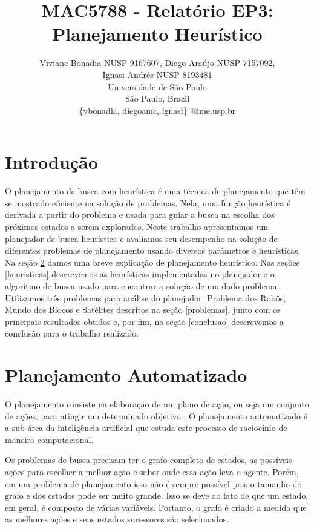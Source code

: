 \documentclass[12pt,a4paper]{article}
\title{MAC5788 - Relatório EP3: Planejamento Heurístico}
\author{Viviane Bonadia NUSP 9167607, Diego Ara\'{u}jo NUSP 7157092, \\ Ignasi Andr\'{e}s NUSP 8193481\\
Universidade de S\~{a}o Paulo\\
S\~{a}o Paulo, Brazil\\ \{vbonadia, diegoamc, ignasi\} @ime.usp.br}
\begin{document}
\maketitle

\section{Introdução}

O planejamento de busca com heurística é uma técnica de planejamento que têm se mostrado eficiente na solução de problemas. Nela, uma função heurística é derivada a partir do problema e usada para guiar a busca na escolha dos próximos estados a serem explorados.
Neste trabalho apresentamos um planejador de busca heurística e avaliamos seu desempenho na solução de diferentes problemas de planejamento usando diversos parâmetros e heurísticas. 
Na seção \ref{planejamento} damos uma breve explicação de planejamento heurístico. Nas seções \ref{heuristicas} descrevemos as heurísticas implementadas no planejador e o algoritmo de busca usado para encontrar a solução de um dado problema. Utilizamos três problemas para análise do planejador: Problema dos Robôs, Mundo dos Blocos e Satélites descritos na seção \ref{problemas}, junto com os principais resultados obtidos e, por fim, na seção \ref{conclusao} descrevemos a conclusão para o trabalho realizado.





\section{Planejamento Automatizado}\label{planejamento}


O planejamento consiste na elaboração de um plano de ação, ou seja um conjunto de ações, para atingir um determinado objetivo \cite{russell1995artificial}. 
O planejamento automatizado é a sub-área da inteligência artificial que estuda este processo de raciocínio de maneira computacional.

Os problemas de busca precisam ter o grafo completo de estados, as possíveis ações para escolher a melhor ação e saber onde essa ação leva o agente. 
Porém, em um problema de planejamento isso não é sempre possível pois o tamanho do grafo e dos estados pode ser muito grande. Isso se deve ao fato de que um estado, em geral, é composto de várias variáveis.
Portanto, o grafo é criado a medida que as melhores ações e seus estados sucessores são selecionados. 
\end{document}
